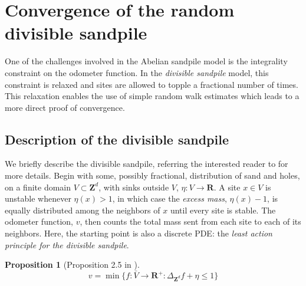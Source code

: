 \documentclass[12pt]{amsart}
\newcommand{\R}{\mathbf{R}}
\newcommand{\Z}{\mathbf{Z}}
\newtheorem{prop}{Proposition}[section]
\begin{document}









\section{Convergence of the random divisible sandpile} \label{sec:divisible_sandpile}
One of the challenges involved in the Abelian sandpile model is the integrality constraint on the odometer function. 
In the {\it divisible sandpile} model, this constraint is relaxed and sites are allowed to topple a fractional number of times. 
This relaxation enables the use of simple random walk estimates which leads to a more direct proof of convergence. 

\subsection{Description of the divisible sandpile}
We briefly describe the divisible sandpile, referring the interested reader to \cite{levine2010scaling,levine2016divisible} for more details. 
Begin with some, possibly fractional, distribution of sand and holes, on a finite domain $V \subset \Z^d$, with sinks outside $V$, $\eta : V \to \R$.  A site $x \in V$ is unstable whenever $\eta(x) > 1$,  %
in which case the {\it excess mass}, $\eta(x) - 1$, is equally distributed among the neighbors of $x$ until every site is stable. The odometer function,  %
$v$, then counts the total mass sent from each site to each of its neighbors. Here, the starting point is also a discrete PDE: the  %
{\it least action principle for the divisible sandpile}. 
\begin{prop}[Proposition 2.5 in \cite{levine2016divisible}] \label{prop:div_lap}
\[
v = \min\{ f: \bar{V} \to \R^+: \Delta_{\Z^d} f + \eta \leq 1 \}
\]
\end{prop}
\end{document}
